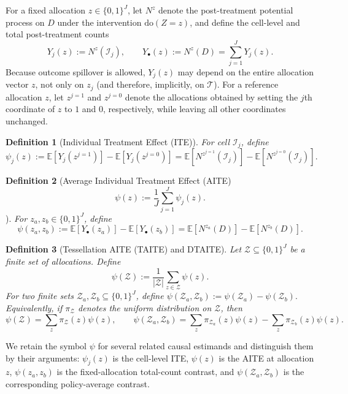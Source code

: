\documentclass{statsoc}
\newtheorem{definition}[definition]{Definition}
\newcommand{\bbE}{\mathbb{E}}
\newcommand{\1}{\mathbbm{1}}
\newcommand{\Nproc}{N}
\begin{document}
For a fixed allocation \(z\in\{0,1\}^J\), let \(\Nproc^z\) denote the post-treatment potential process on \(D\) under the intervention \(\mathrm{do}(Z=z)\), and define the cell-level and total post-treatment counts
\[
Y_j(z):=\Nproc^z(\mathcal I_j),\qquad
Y_\bullet(z):=\Nproc^z(D)=\sum_{j=1}^J Y_j(z).
\]
Because outcome spillover is allowed, \(Y_j(z)\) may depend on the entire allocation vector \(z\), not only on \(z_j\) (and therefore,  implicitly, on $\mathcal{T}$). For a reference allocation \(z\), let \(z^{j=1}\) and \(z^{j=0}\) denote the allocations obtained by setting the \(j\)th coordinate of \(z\) to \(1\) and \(0\), respectively, while leaving all other coordinates unchanged.

\begin{definition}[Individual Treatment Effect (ITE)]
For cell \(\mathcal I_j\), define
\[
\psi_j(z)
:=
\bbE\!\left[Y_j\!\left(z^{j=1}\right)\right]
-
\bbE\!\left[Y_j\!\left(z^{j=0}\right)\right]
=
\bbE\!\left[\Nproc^{z^{j=1}}(\mathcal I_j)\right]
-
\bbE\!\left[\Nproc^{z^{j=0}}(\mathcal I_j)\right].
\]
\end{definition}

\begin{definition}[Average Individual Treatment Effect (AITE)
\[
\psi(z):=\frac{1}{J}\sum_{j=1}^J \psi_j(z).
\]
\end{definition}

\begin{definition}[Difference under fixed allocations]
For \(z_a,z_b\in\{0,1\}^J\), define
\[
\psi(z_a,z_b)
:=
\bbE\!\left[Y_\bullet(z_a)\right]
-
\bbE\!\left[Y_\bullet(z_b)\right]
=
\bbE\!\left[\Nproc^{z_a}(D)\right]
-
\bbE\!\left[\Nproc^{z_b}(D)\right].
\]
\end{definition}

\begin{definition}[Tessellation AITE (TAITE) and DTAITE]
Let \(\mathcal Z\subseteq\{0,1\}^J\) be a finite set of allocations. Define
\[
\psi(\mathcal Z):=\frac{1}{|\mathcal Z|}\sum_{z\in\mathcal Z}\psi(z).
\]
For two finite sets \(\mathcal Z_a,\mathcal Z_b\subseteq\{0,1\}^J\), define
\(
\psi(\mathcal Z_a,\mathcal Z_b):=\psi(\mathcal Z_a)-\psi(\mathcal Z_b).
\)
Equivalently, if \(\pi_{\mathcal Z}\) denotes the uniform distribution on \(\mathcal Z\), then
\[
\psi(\mathcal Z)=\sum_{z}\pi_{\mathcal Z}(z)\psi(z),
\qquad
\psi(\mathcal Z_a,\mathcal Z_b)
=
\sum_z \pi_{\mathcal Z_a}(z)\psi(z)
-
\sum_z \pi_{\mathcal Z_b}(z)\psi(z).
\]
\end{definition}

We retain the symbol \(\psi\) for several related causal estimands and distinguish them by their arguments: \(\psi_j(z)\) is the cell-level ITE, \(\psi(z)\) is the AITE at allocation \(z\), \(\psi(z_a,z_b)\) is the fixed-allocation total-count contrast, and \(\psi(\mathcal Z_a,\mathcal Z_b)\) is the corresponding policy-average contrast.
\end{document}

